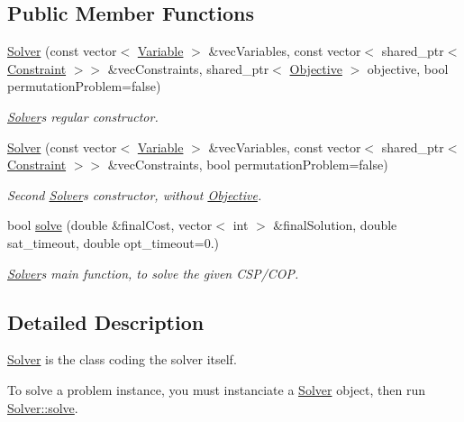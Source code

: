 \subsection*{Public Member Functions}
\begin{DoxyCompactItemize}
\item 
\hyperlink{classghost_1_1Solver_aee56a03908003c1a1120466e72ac3799}{Solver} (const vector$<$ \hyperlink{classghost_1_1Variable}{Variable} $>$ \&vec\+Variables, const vector$<$ shared\+\_\+ptr$<$ \hyperlink{classghost_1_1Constraint}{Constraint} $>$$>$ \&vec\+Constraints, shared\+\_\+ptr$<$ \hyperlink{classghost_1_1Objective}{Objective} $>$ objective, bool permutation\+Problem=false)
\begin{DoxyCompactList}\small\item\em \hyperlink{classghost_1_1Solver}{Solver}\textquotesingle{}s regular constructor. \end{DoxyCompactList}\item 
\hyperlink{classghost_1_1Solver_ade9340e94794a2ed0058957443be34e0}{Solver} (const vector$<$ \hyperlink{classghost_1_1Variable}{Variable} $>$ \&vec\+Variables, const vector$<$ shared\+\_\+ptr$<$ \hyperlink{classghost_1_1Constraint}{Constraint} $>$$>$ \&vec\+Constraints, bool permutation\+Problem=false)
\begin{DoxyCompactList}\small\item\em Second \hyperlink{classghost_1_1Solver}{Solver}\textquotesingle{}s constructor, without \hyperlink{classghost_1_1Objective}{Objective}. \end{DoxyCompactList}\item 
bool \hyperlink{classghost_1_1Solver_acc72c5a651e888858c10dfe300d96fa8}{solve} (double \&final\+Cost, vector$<$ int $>$ \&final\+Solution, double sat\+\_\+timeout, double opt\+\_\+timeout=0.)
\begin{DoxyCompactList}\small\item\em \hyperlink{classghost_1_1Solver}{Solver}\textquotesingle{}s main function, to solve the given C\+S\+P/\+C\+OP. \end{DoxyCompactList}\end{DoxyCompactItemize}


\subsection{Detailed Description}
\hyperlink{classghost_1_1Solver}{Solver} is the class coding the solver itself. 

To solve a problem instance, you must instanciate a \hyperlink{classghost_1_1Solver}{Solver} object, then run \hyperlink{classghost_1_1Solver_acc72c5a651e888858c10dfe300d96fa8}{Solver\+::solve}.

